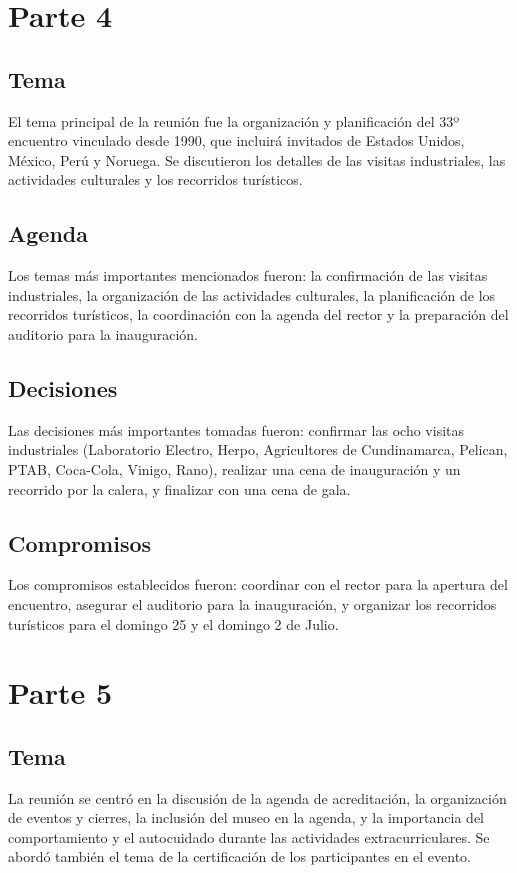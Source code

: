 \documentclass{article}
\begin{document}
\section{Parte 4}
\subsection{Tema}
El tema principal de la reunión fue la organización y planificación del 33º encuentro vinculado desde 1990, que incluirá invitados de Estados Unidos, México, Perú y Noruega. Se discutieron los detalles de las visitas industriales, las actividades culturales y los recorridos turísticos.

\subsection{Agenda}
Los temas más importantes mencionados fueron: la confirmación de las visitas industriales, la organización de las actividades culturales, la planificación de los recorridos turísticos, la coordinación con la agenda del rector y la preparación del auditorio para la inauguración.

\subsection{Decisiones}
Las decisiones más importantes tomadas fueron: confirmar las ocho visitas industriales (Laboratorio Electro, Herpo, Agricultores de Cundinamarca, Pelican, PTAB, Coca-Cola, Vinigo, Rano), realizar una cena de inauguración y un recorrido por la calera, y finalizar con una cena de gala.

\subsection{Compromisos}
Los compromisos establecidos fueron: coordinar con el rector para la apertura del encuentro, asegurar el auditorio para la inauguración, y organizar los recorridos turísticos para el domingo 25 y el domingo 2 de Julio.
\section{Parte 5}
\subsection{Tema}
La reunión se centró en la discusión de la agenda de acreditación, la organización de eventos y cierres, la inclusión del museo en la agenda, y la importancia del comportamiento y el autocuidado durante las actividades extracurriculares. Se abordó también el tema de la certificación de los participantes en el evento.
\end{document}
